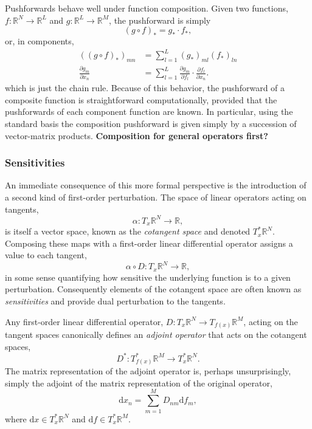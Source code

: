 Pushforwards behave well under function composition.  Given two functions,
$f : \mathbb{R}^{N} \rightarrow \mathbb{R}^{L}$ and
$g : \mathbb{R}^{L} \rightarrow \mathbb{R}^{M}$, the pushforward is simply
%
\begin{equation*}
\left( g \circ f \right)_{*} = g_{*} \cdot f_{*},
\end{equation*}
%
or, in components,
%
\begin{align*}
\left( \left( g \circ f \right)_{*} \right)_{mn} &= 
\sum_{l = 1}^{L} \left( g_{*} \right)_{ml} \left( f_{*} \right)_{ln}
\\
\frac{ \partial g_{m} }{ \partial x_{n} } &= 
\sum_{l = 1}^{L} \frac{ \partial g_{m} }{ \partial f_{l} } \cdot \frac{ \partial f_{l} }{ \partial x_{n} }.
\end{align*}
%
which is just the chain rule.  Because of this behavior, the pushforward of a
composite function is straightforward computationally, provided that the pushforwards
of each component function are known.  In particular, using the standard basis the
composition pushforward is given simply by a succession of vector-matrix products.
\textbf{Composition for general operators first?}

\subsubsection{Sensitivities}

An immediate consequence of this more formal perspective is the introduction of a second
kind of first-order perturbation.  The space of linear operators acting on tangents,
%
\begin{equation*}
\alpha : T_{x} \mathbb{R}^{N} \rightarrow \mathbb{R},
\end{equation*}
%
is itself a vector space, known as the \textit{cotangent space} and denoted 
$T^{*}_{x} \mathbb{R}^{N}$.  Composing these maps with a first-order linear differential 
operator assigns a value to each tangent,
%
\begin{equation*}
\alpha \circ D : T_{x} \mathbb{R}^{N} \rightarrow \mathbb{R},
\end{equation*}
%
in some sense quantifying how sensitive the underlying function is to a given 
perturbation.  Consequently elements of the cotangent space are often known as
\textit{sensitivities} and provide dual perturbation to the tangents.

Any first-order linear differential operator,
$D : T_{x} \mathbb{R}^{N} \rightarrow T_{ f ( x ) } \mathbb{R}^{M}$, acting on
the tangent spaces canonically defines an \textit{adjoint operator} that acts on the 
cotangent spaces,
%
\begin{equation*}
D^{*} : T^{*}_{f (x) } \mathbb{R}^{M} \rightarrow T^{*}_{x} \mathbb{R}^{N}.
\end{equation*}
%
The matrix representation of the adjoint operator is, perhaps unsurprisingly, 
simply the adjoint of the matrix representation of the original operator,
%
\begin{equation*}
\mathrm{d} x_{n} = \sum_{m = 1}^{M} D_{nm} \mathrm{d} f_{m},
\end{equation*}
%
where $\mathrm{d} x \in T^{*}_{x} \mathbb{R}^{N}$ and
$\mathrm{d} f \in T^{*}_{x} \mathbb{R}^{M}$.

